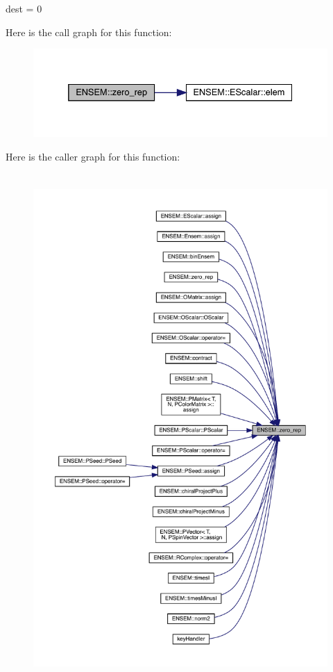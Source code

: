 dest = 0 

Here is the call graph for this function\+:
\nopagebreak
\begin{figure}[H]
\begin{center}
\leavevmode
\includegraphics[width=332pt]{d4/dca/group__escalar_gacea96299b1b52d3a75cdb109c3b03b05_cgraph}
\end{center}
\end{figure}
Here is the caller graph for this function\+:
\nopagebreak
\begin{figure}[H]
\begin{center}
\leavevmode
\includegraphics[height=550pt]{d4/dca/group__escalar_gacea96299b1b52d3a75cdb109c3b03b05_icgraph}
\end{center}
\end{figure}
